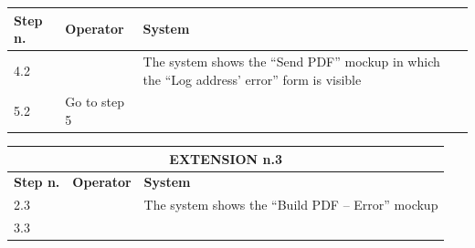 {{{\begin{table}[h]
\begin{tabular}{|p{2cm}|p{6cm}|p{6cm}|}
			\hline
				\centering \vspace{1mm} \bfseries{Step n.} \vspace{1mm} & \vspace{1mm} \bfseries{Operator} \vspace{1mm} & \vspace{1mm} \bfseries{System} \vspace{1mm}\\
			\hline
				\vspace{1mm} 4.2\vspace{1mm} &
				\vspace{1mm} \vspace{1mm} & 
				\vspace{1mm} The system shows the “Send PDF” mockup in which the “Log address’ error” form is visible \vspace{1mm} \\
			\hline
				\vspace{1mm} 5.2\vspace{1mm} &
				\vspace{1mm} Go to step 5\vspace{1mm} & 
				\vspace{1mm} \vspace{1mm} \\
			\hline
			\end{tabular}
			\end{table}
			\begin{table}[h]
			\begin{tabular}{|p{2cm}|p{6cm}|p{6cm}|}
			\hline
				\multicolumn{3}{|c|}{EXTENSION n.3}\\
			\hline
				\centering \vspace{1mm} \bfseries{Step n.} \vspace{1mm} & \vspace{1mm} \bfseries{Operator} \vspace{1mm} & \vspace{1mm} \bfseries{System} \vspace{1mm}\\
			\hline
				\vspace{1mm} 2.3\vspace{1mm} &
				\vspace{1mm} \vspace{1mm} & 
				\vspace{1mm} The system shows the “Build PDF – Error” mockup\vspace{1mm} \\
			\hline
				\vspace{1mm} 3.3\vspace{1mm} &

\end{tabular}
\end{table}}}}
